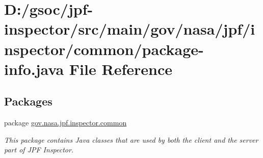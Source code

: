 \hypertarget{common_2package-info_8java}{}\section{D\+:/gsoc/jpf-\/inspector/src/main/gov/nasa/jpf/inspector/common/package-\/info.java File Reference}
\label{common_2package-info_8java}
\subsection*{Packages}
\begin{DoxyCompactItemize}
\item 
package \hyperlink{namespacegov_1_1nasa_1_1jpf_1_1inspector_1_1common}{gov.\+nasa.\+jpf.\+inspector.\+common}
\begin{DoxyCompactList}\small\item\em This package contains Java classes that are used by both the client and the server part of J\+PF Inspector. \end{DoxyCompactList}\end{DoxyCompactItemize}

